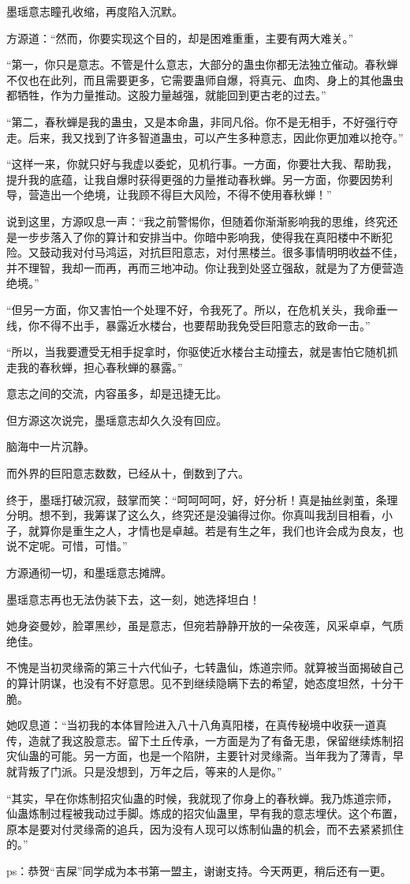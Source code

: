 \begin{this_body}
墨瑶意志瞳孔收缩，再度陷入沉默。

方源道：“然而，你要实现这个目的，却是困难重重，主要有两大难关。”

“第一，你只是意志。不管是什么意志，大部分的蛊虫你都无法独立催动。春秋蝉不仅也在此列，而且需要更多，它需要蛊师自爆，将真元、血肉、身上的其他蛊虫都牺牲，作为力量推动。这股力量越强，就能回到更古老的过去。”

“第二，春秋蝉是我的蛊虫，又是本命蛊，非同凡俗。你不是无相手，不好强行夺走。后来，我又找到了许多智道蛊虫，可以产生多种意志，因此你更加难以抢夺。”

“这样一来，你就只好与我虚以委蛇，见机行事。一方面，你要壮大我、帮助我，提升我的底蕴，让我自爆时获得更强的力量推动春秋蝉。另一方面，你要因势利导，营造出一个绝境，让我顾不得巨大风险，不得不使用春秋蝉！”

说到这里，方源叹息一声：“我之前警惕你，但随着你渐渐影响我的思维，终究还是一步步落入了你的算计和安排当中。你暗中影响我，使得我在真阳楼中不断犯险。又鼓动我对付马鸿运，对抗巨阳意志，对付黑楼兰。很多事情明明收益不佳，并不理智，我却一而再，再而三地冲动。你让我到处竖立强敌，就是为了方便营造绝境。”

“但另一方面，你又害怕一个处理不好，令我死了。所以，在危机关头，我命垂一线，你不得不出手，暴露近水楼台，也要帮助我免受巨阳意志的致命一击。”

“所以，当我要遭受无相手捉拿时，你驱使近水楼台主动撞去，就是害怕它随机抓走我的春秋蝉，担心春秋蝉的暴露。”

意志之间的交流，内容虽多，却是迅捷无比。

但方源这次说完，墨瑶意志却久久没有回应。

脑海中一片沉静。

而外界的巨阳意志数数，已经从十，倒数到了六。

终于，墨瑶打破沉寂，鼓掌而笑：“呵呵呵呵，好，好分析！真是抽丝剥茧，条理分明。想不到，我筹谋了这么久，终究还是没骗得过你。你真叫我刮目相看，小子，就算你是重生之人，才情也是卓越。若是有生之年，我们也许会成为良友，也说不定呢。可惜，可惜。”

方源通彻一切，和墨瑶意志摊牌。

墨瑶意志再也无法伪装下去，这一刻，她选择坦白！

她身姿曼妙，脸罩黑纱，虽是意志，但宛若静静开放的一朵夜莲，风采卓卓，气质绝佳。

不愧是当初灵缘斋的第三十六代仙子，七转蛊仙，炼道宗师。就算被当面揭破自己的算计阴谋，也没有不好意思。见不到继续隐瞒下去的希望，她态度坦然，十分干脆。

她叹息道：“当初我的本体冒险进入八十八角真阳楼，在真传秘境中收获一道真传，造就了我这股意志。留下土丘传承，一方面是为了有备无患，保留继续炼制招灾仙蛊的可能。另一方面，也是一个陷阱，主要针对灵缘斋。当年我为了薄青，早就背叛了门派。只是没想到，万年之后，等来的人是你。”

“其实，早在你炼制招灾仙蛊的时候，我就现了你身上的春秋蝉。我乃炼道宗师，仙蛊炼制过程被我动过手脚。炼成的招灾仙蛊里，早有我的意志埋伏。这个布置，原本是要对付灵缘斋的追兵，因为没有人现可以炼制仙蛊的机会，而不去紧紧抓住的。”

ps：恭贺“吉屎”同学成为本书第一盟主，谢谢支持。今天两更，稍后还有一更。

\end{this_body}

